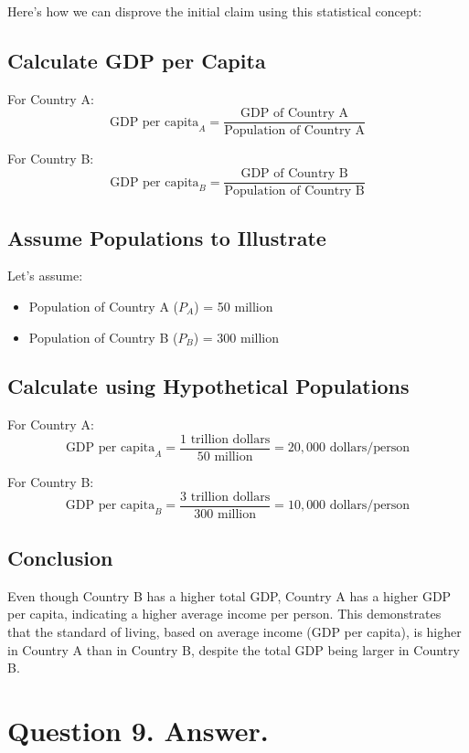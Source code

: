 \documentclass{article}
\begin{document}
Here's how we can disprove the initial claim using this statistical concept:

\subsection*{Calculate GDP per Capita}

For Country A:
\[
\text{GDP per capita}_A = \frac{\text{GDP of Country A}}{\text{Population of Country A}}
\]

For Country B:
\[
\text{GDP per capita}_B = \frac{\text{GDP of Country B}}{\text{Population of Country B}}
\]

\subsection*{Assume Populations to Illustrate}

Let’s assume:
\begin{itemize}
    \item Population of Country A ($P_A$) = 50 million
    \item Population of Country B ($P_B$) = 300 million
\end{itemize}

\subsection*{Calculate using Hypothetical Populations}

For Country A:
\[
\text{GDP per capita}_A = \frac{1 \text{ trillion dollars}}{50 \text{ million}} = 20,000 \text{ dollars/person}
\]

For Country B:
\[
\text{GDP per capita}_B = \frac{3 \text{ trillion dollars}}{300 \text{ million}} = 10,000 \text{ dollars/person}
\]

\subsection*{Conclusion}

Even though Country B has a higher total GDP, Country A has a higher GDP per capita, indicating a higher average income per person. This demonstrates that the standard of living, based on average income (GDP per capita), is higher in Country A than in Country B, despite the total GDP being larger in Country B.

\section*{Question 9. Answer.}
\end{document}
